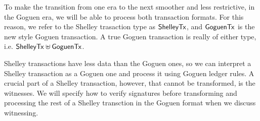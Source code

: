 To make the transition from one era to the next smoother and less restrictive,
in the Goguen era, we will be able to process both transaction formats.
For this reason, we refer to the Shelley
trasaction type as $\mathsf{ShelleyTx}$, and $\mathsf{GoguenTx}$ is the new style Goguen transaction.
A true Goguen transaction is really of either type,
i.e. $\mathsf{ShelleyTx} \uplus \mathsf{GoguenTx}$.

Shelley transactions have less data than the Goguen ones, so we can interpret
a Shelley transaction as a Goguen one and process it using Goguen ledger
rules. A crucial part of a Shelley transaction,
however, that cannot be transformed, is the witnesses.
We will specify how to verify signatures before transforming and processing
the rest of a Shelley transction in the Goguen format when we discuss witnessing.

